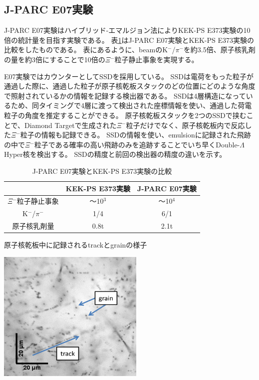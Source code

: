 \documentclass[12pt,a4paper]{jarticle}
\begin{document}
\subsection{J-PARC E07実験}
J-PARC E07実験はハイブリッド-エマルジョン法によりKEK-PS E373実験の10倍の統計量を目指す実験である。
表\ref{tab:compare_E07_E373}はJ-PARC E07実験とKEK-PS E373実験の比較をしたものである。
表にあるように、beamのK$^-$/$\pi$$^-$を約3.5倍、原子核乳剤の量を約3倍にすることで10倍の$\Xi$$^-$粒子静止事象を実現する。
\par
E07実験ではカウンターとしてSSDを採用している。
SSDは電荷をもった粒子が通過した際に、通過した粒子が原子核乾板スタックのどの位置にどのような角度で照射されているかの情報を記録する検出器である。
SSDは4層構造になっているため、同タイミングで4層に渡って検出された座標情報を使い、通過した荷電粒子の角度を推定することができる。
原子核乾板スタックを2つのSSDで挟むことで、Diamond Targetで生成された$\Xi$$^-$粒子だけでなく、原子核乾板内で反応した$\Xi$$^-$粒子の情報も記録できる。
SSDの情報を使い、emulsionに記録された飛跡の中で$\Xi$$^-$粒子である確率の高い飛跡のみを追跡することでいち早くDouble-$\Lambda$Hyper核を検出する。
SSDの精度と前回の検出器の精度の違いを示す。
\begin{table}[htbp]
\centering
\caption{J-PARC E07実験とKEK-PS E373実験の比較\label{tab:compare_E07_E373}}
\begin{tabular}{c|c|c}
　　　&KEK-PS E373実験&J-PARC E07実験\\
\hline
\hline
$\Xi$$^-$粒子静止事象 & ～10$^3$    & ～10$^4$  \\
K$^-$/$\pi$$^-$ & 1/4  & 6/1 \\
原子核乳剤量 & 0.8t & 2.1t  \\
\hline
\end{tabular}
\end{table}
\begin{table}[htbp]
\centering
\caption{原子核乾板中に記録されるtrackとgrainの様子\label{tab:grain_track}}
\begin{center}
    \includegraphics[width=70mm]{grainfog.png}
\end{center}
\end{table}
\end{document}
